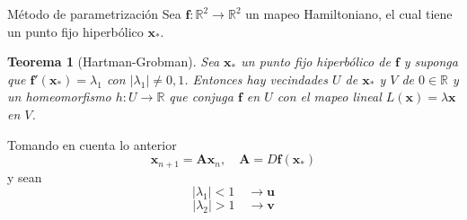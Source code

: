 \documentclass[11pt]{beamer}
\newtheorem{teorema}[theorem]{Teorema}
\theoremstyle{definition}
\begin{document}
\begin{frame}{M\'etodo de parametrizaci\'on}
Sea $\mathbf{f}:\mathbb{R}^{2}\rightarrow\mathbb{R}^{2}$ un mapeo Hamiltoniano, el cual tiene un punto fijo hiperb\'olico $\mathbf{x}_{*}$.\\
\begin{teorema}[Hartman-Grobman]
Sea $\mathbf{x}_{*}$ un punto fijo hiperb\'olico de $\mathbf{f}$ y suponga que $\mathbf{f'}(\mathbf{x_{*}})=\lambda_{1}$ con $ \vert \lambda_{1}\vert\neq 0,1 $. Entonces hay vecindades $U$ de $\mathbf{x_{*}}$ y $V$ de $0\in\mathbb{R}$ y un homeomorfismo $h:U\rightarrow\mathbb{R}$ que conjuga $\mathbf{f}$ en $U$ con el mapeo lineal $L(\mathbf{x})=\lambda\mathbf{x}$  en $V$.
\end{teorema}
Tomando en cuenta lo anterior
\begin{equation}
\mathbf{x}_{n+1} =\mathbf{A}\mathbf{x}_{n}, \quad \mathbf{A}=D\mathbf{f}(\mathbf{x}_{*})
\label{sistema_lineal}
\end{equation}
y sean \\
\begin{equation}
\vert \lambda_{1}\vert<1 \quad \rightarrow \mathbf{u}
\label{primer_valorp}
\end{equation}
\begin{equation}
\vert \lambda_{2}\vert>1 \quad \rightarrow \mathbf{v}
\label{segundo_valorp}
\end{equation}

\end{frame}
\end{document}
